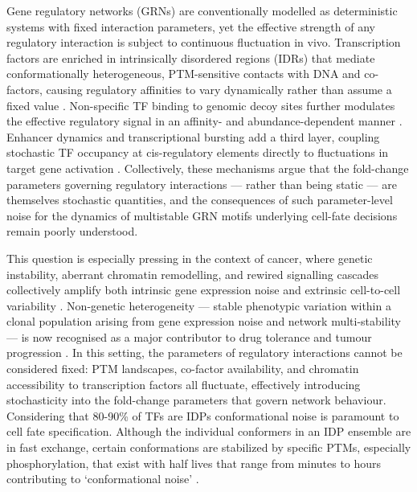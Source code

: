 \documentclass[11pt]{article}
\begin{document}
Gene regulatory networks (GRNs) are conventionally modelled as deterministic systems with fixed interaction parameters, yet the effective strength of any regulatory interaction is subject to continuous fluctuation in vivo. Transcription factors are enriched in intrinsically disordered regions (IDRs) that mediate conformationally heterogeneous, PTM-sensitive contacts with DNA and co-factors, causing regulatory affinities to vary dynamically rather than assume a fixed value \cite{Ferrie2022Structure-functionRegulation, Holehouse2023TheRegions}. Non-specific TF binding to genomic decoy sites further modulates the effective regulatory signal in an affinity- and abundance-dependent manner \cite{Dey2020EnhancementSites, Burger2012InfluenceExpression}. Enhancer dynamics and transcriptional bursting add a third layer, coupling stochastic TF occupancy at cis-regulatory elements directly to fluctuations in target gene activation \cite{Raj2006StochasticCells, Fukaya2016EnhancerBursting}. Collectively, these mechanisms argue that the fold-change parameters governing regulatory interactions — rather than being static — are themselves stochastic quantities, and the consequences of such parameter-level noise for the dynamics of multistable GRN motifs underlying cell-fate decisions remain poorly understood.


This question is especially pressing in the context of cancer, where genetic instability, aberrant chromatin remodelling, and rewired signalling cascades collectively amplify both intrinsic gene expression noise and extrinsic cell-to-cell variability \cite{Brock2009Non-geneticTumours, Landau2014LocallyLeukemia, Hanahan2026HallmarksBeyond}. Non-genetic heterogeneity — stable phenotypic variation within a clonal population arising from gene expression noise and network multi-stability — is now recognised as a major contributor to drug tolerance and tumour progression \cite{Hanahan2026HallmarksBeyond, Franca2024CellularContinuum, Shaffer2017RareResistance}. In this setting, the parameters of regulatory interactions cannot be considered fixed: PTM landscapes, co-factor availability, and chromatin accessibility to transcription factors all fluctuate, effectively introducing stochasticity into the fold-change parameters that govern network behaviour. Considering that 80-90\% of TFs are IDPs \cite{Staby2017} conformational noise is paramount to cell fate specification. Although the individual conformers in an IDP ensemble are in fast exchange, certain conformations are stabilized by specific PTMs, especially phosphorylation, that exist with half lives that range from minutes to hours contributing to ‘conformational noise’ \cite{Kulkarni2022, Kulkarni2019}.
\end{document}
